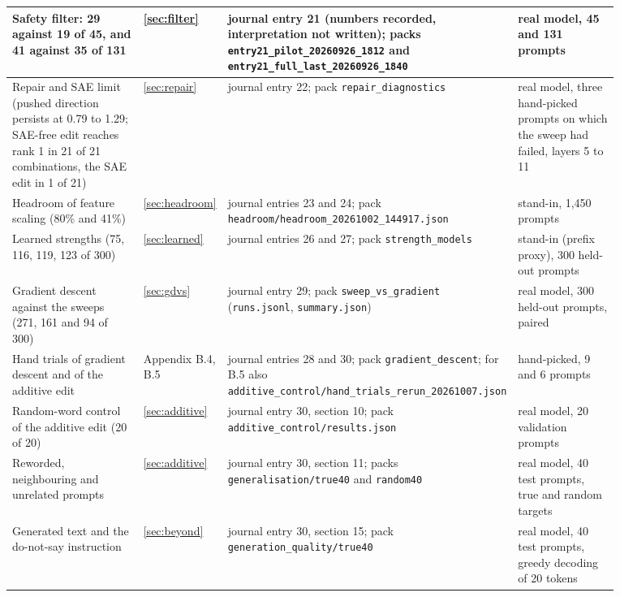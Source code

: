 \documentclass[12pt,a4paper]{report}
\begin{document}
{\begin{longtable}{|>{\raggedright\arraybackslash}p{0.277\linewidth}|>{\raggedright\arraybackslash}p{0.090\linewidth}|>{\raggedright\arraybackslash}p{0.294\linewidth}|>{\raggedright\arraybackslash}p{0.212\linewidth}|}
Safety filter: 29 against 19 of 45, and 41 against 35 of 131 & \ref{sec:filter} & journal entry 21 (numbers recorded, interpretation not written); packs \texttt{entry21\_\allowbreak{}pilot\_\allowbreak{}20260926\_\allowbreak{}1812} and \texttt{entry21\_\allowbreak{}full\_\allowbreak{}last\_\allowbreak{}20260926\_\allowbreak{}1840} & real model, 45 and 131 prompts \\ \hline
Repair and SAE limit (pushed direction persists at 0.79 to 1.29; SAE-free edit reaches rank 1 in 21 of 21 combinations, the SAE edit in 1 of 21) & \ref{sec:repair} & journal entry 22; pack \texttt{repair\_\allowbreak{}diagnostics} & real model, three hand-picked prompts on which the sweep had failed, layers 5 to 11 \\ \hline
Headroom of feature scaling (80\% and 41\%) & \ref{sec:headroom} & journal entries 23 and 24; pack \texttt{headroom/\allowbreak{}headroom\_\allowbreak{}20261002\_\allowbreak{}144917.\allowbreak{}json} & stand-in, 1,450 prompts \\ \hline
Learned strengths (75, 116, 119, 123 of 300) & \ref{sec:learned} & journal entries 26 and 27; pack \texttt{strength\_\allowbreak{}models} & stand-in (prefix proxy), 300 held-out prompts \\ \hline
Gradient descent against the sweeps (271, 161 and 94 of 300) & \ref{sec:gdvs} & journal entry 29; pack \texttt{sweep\_\allowbreak{}vs\_\allowbreak{}gradient} (\texttt{runs.\allowbreak{}jsonl}, \texttt{summary.\allowbreak{}json}) & real model, 300 held-out prompts, paired \\ \hline
Hand trials of gradient descent and of the additive edit & Appendix B.4, B.5 & journal entries 28 and 30; pack \texttt{gradient\_\allowbreak{}descent}; for B.5 also \texttt{additive\_\allowbreak{}control/\allowbreak{}hand\_\allowbreak{}trials\_\allowbreak{}rerun\_\allowbreak{}20261007.\allowbreak{}json} & hand-picked, 9 and 6 prompts \\ \hline
Random-word control of the additive edit (20 of 20) & \ref{sec:additive} & journal entry 30, section 10; pack \texttt{additive\_\allowbreak{}control/\allowbreak{}results.\allowbreak{}json} & real model, 20 validation prompts \\ \hline
Reworded, neighbouring and unrelated prompts & \ref{sec:additive} & journal entry 30, section 11; packs \texttt{generalisation/\allowbreak{}true40} and \texttt{random40} & real model, 40 test prompts, true and random targets \\ \hline
Generated text and the do-not-say instruction & \ref{sec:beyond} & journal entry 30, section 15; pack \texttt{generation\_\allowbreak{}quality/\allowbreak{}true40} & real model, 40 test prompts, greedy decoding of 20 tokens \\ \hline

\end{longtable}}
\end{document}
